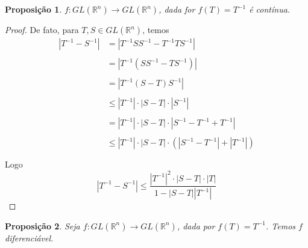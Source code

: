 \documentclass{article}
\newtheorem{prop}{Proposição}[section]
\theoremstyle{theorem}
\theoremstyle{lemma}
\theoremstyle{definition}
\theoremstyle{remark}
\begin{document}
\begin{prop}
	$f:GL(\mathbb{R}^n) \to GL(\mathbb{R}^n)$, dada for $f(T) = T^{-1}$ é contínua.
\end{prop}
\begin{proof}
	De fato, para  \( T,S\in GL(\mathbb{R}^n)\), temos 
	\begin{align*}
		| T^{-1} - S^{-1} | &= |T^{-1} S S^{-1} - T^{-1}TS^{-1} | \\~\\
		&= | T^{-1} ( SS^{-1} - TS^{-1} ) | \\~\\
		&= | T^{-1}  (S - T) S^{-1}  | \\~\\
		&\leq | T^{-1} | \cdot |  S - T |\cdot | S^{-1}  | \\~\\
		&= | T^{-1} | \cdot |  S - T |\cdot | S^{-1} -T^{-1} + T^{-1}  | \\~\\
		&\leq | T^{-1} | \cdot |  S - T |\cdot ( | S^{-1} -T^{-1} |+|  T^{-1}  |) \\~\\
	\end{align*}
	Logo \[ |T^{-1} - S^{-1}| \leq \dfrac{|T^{-1}|^{2} \cdot |S-T|\cdot |T|}{1- |S - T||T^{-1}|}\]
\end{proof}
\begin{prop}
Seja $f: GL(\mathbb{R}^n) \to GL(\mathbb{R}^n)$, dada por $f(T) = T^{-1}$.  Temos $f$ diferenciável.
\end{prop}
\end{document}
